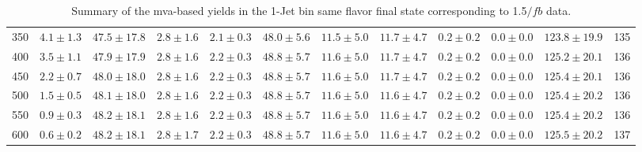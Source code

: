 \begin{table}
{\begin{center}
\begin{tabular}{l c c c c c c c c c c c }
350 & $4.1\pm1.3$ & $47.5\pm17.8$ & $2.8\pm1.6$ & $2.1\pm0.3$ & $48.0\pm5.6$ & $11.5\pm5.0$ & $11.7\pm4.7$ & $0.2\pm0.2$ & $0.0\pm0.0$ & $123.8\pm19.9$ & 135 \\
400 & $3.5\pm1.1$ & $47.9\pm17.9$ & $2.8\pm1.6$ & $2.2\pm0.3$ & $48.8\pm5.7$ & $11.6\pm5.0$ & $11.7\pm4.7$ & $0.2\pm0.2$ & $0.0\pm0.0$ & $125.2\pm20.1$ & 136 \\
450 & $2.2\pm0.7$ & $48.0\pm18.0$ & $2.8\pm1.6$ & $2.2\pm0.3$ & $48.8\pm5.7$ & $11.6\pm5.0$ & $11.7\pm4.7$ & $0.2\pm0.2$ & $0.0\pm0.0$ & $125.4\pm20.1$ & 136 \\
500 & $1.5\pm0.5$ & $48.1\pm18.0$ & $2.8\pm1.6$ & $2.2\pm0.3$ & $48.8\pm5.7$ & $11.6\pm5.0$ & $11.6\pm4.7$ & $0.2\pm0.2$ & $0.0\pm0.0$ & $125.4\pm20.2$ & 136 \\
550 & $0.9\pm0.3$ & $48.2\pm18.1$ & $2.8\pm1.6$ & $2.2\pm0.3$ & $48.8\pm5.7$ & $11.6\pm5.0$ & $11.6\pm4.7$ & $0.2\pm0.2$ & $0.0\pm0.0$ & $125.4\pm20.2$ & 136 \\
600 & $0.6\pm0.2$ & $48.2\pm18.1$ & $2.8\pm1.7$ & $2.2\pm0.3$ & $48.8\pm5.7$ & $11.6\pm5.0$ & $11.6\pm4.7$ & $0.2\pm0.2$ & $0.0\pm0.0$ & $125.5\pm20.2$ & 137 \\
\hline
\end{tabular}
\end{center}
}
\caption{Summary of the mva-based yields in the 1-Jet bin same flavor final state corresponding to 1.5$/fb$ data.}
\end{table}

